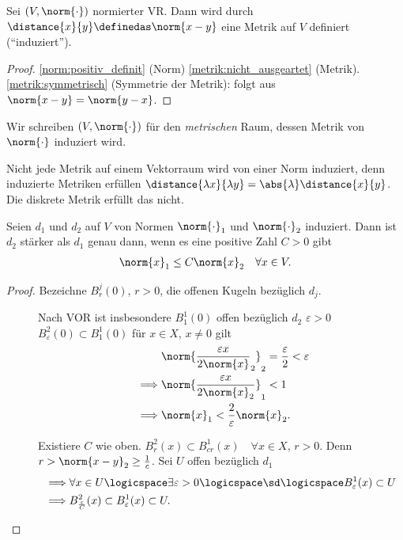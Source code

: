 \begin{lemma}
    Sei \( (V,\norm{\cdot}) \) normierter VR\@. Dann wird durch \( \distance{x}{y}\definedas \norm{x-y} \) eine Metrik auf \( V \) definiert (\enquote{induziert}).
\end{lemma}
\begin{proof}
    \ref{norm:positiv_definit} (Norm) \timplies \ref{metrik:nicht_ausgeartet} (Metrik). \ref{metrik:symmetrisch} (Symmetrie der Metrik): folgt aus \( \norm{x-y}=\norm{y-x} \).
\end{proof}
\begin{notation*}
    Wir schreiben \( (V,\norm{\cdot}) \) für den \emph{metrischen} Raum, dessen Metrik von \( \norm{\cdot} \) induziert wird.
\end{notation*}
\begin{bemerkung*}
    Nicht jede Metrik auf einem Vektorraum wird von einer Norm induziert, denn induzierte Metriken erfüllen \( \distance{\lambda x}{\lambda y}=\abs{\lambda}\distance{x}{y} \). Die diskrete Metrik erfüllt das nicht.
\end{bemerkung*}
\begin{lemma}\label{normen_staerke_abschaetzung}
    Seien \( d_1 \) und \( d_2 \) auf \( V \) von Normen \( \norm{\cdot}_1 \) und \( \norm{\cdot}_2 \) induziert. Dann ist \( d_2 \) stärker als \( d_1 \) genau dann, wenn es eine positive Zahl \( C>0 \) gibt \sd
    \begin{align*}
        \norm{x}_1\leq C\norm{x}_2\quad \forall x\in V.
    \end{align*}
\end{lemma}
\begin{proof}
    Bezeichne \( B_{r}^j(0) \), \( r>0 \), die offenen Kugeln bezüglich \( d_j \).
    \begin{description}
        \item[\hin] Nach VOR ist insbesondere \( B_1^1(0) \) offen bezüglich \( d_2 \) \timplies \texists \( \varepsilon>0 \) \sd \( B_\varepsilon^2(0)\subset B_1^1(0) \) \timplies für \( x\in X \), \( x\neq 0 \) gilt
        \begin{align*}
            &\norm{\frac{\varepsilon x}{2\norm{x}}_2}_2=\frac{\varepsilon}{2}<\varepsilon\\\
            \implies &\norm{\frac{\varepsilon x}{2\norm{x}_2}}_1 <1 \\
            \implies &\norm{x}_1<\frac{2}{\varepsilon}\norm{x}_2.
        \end{align*} 
        \item[\rueck] Existiere \( C \) wie oben. \( B_r^2(x)\subset B_{cr}^1(x)\quad \forall x\in X \), \( r>0 \). Denn \( r>\norm{x-y}_2\geq \frac{1}{c} \). Sei \( U \) offen bezüglich \( d_1 \)
        \begin{align*}
            \implies &\forall x\in U\logicspace \exists \varepsilon>0\logicspace\text{\sd} \logicspace B_{\varepsilon}^1(x)\subset U\\
            \implies &B_{\frac{\varepsilon}{C}}^2(x)\subset B_{\varepsilon}^1(x)\subset U.
        \end{align*} 
    \end{description}
    
\end{proof}
